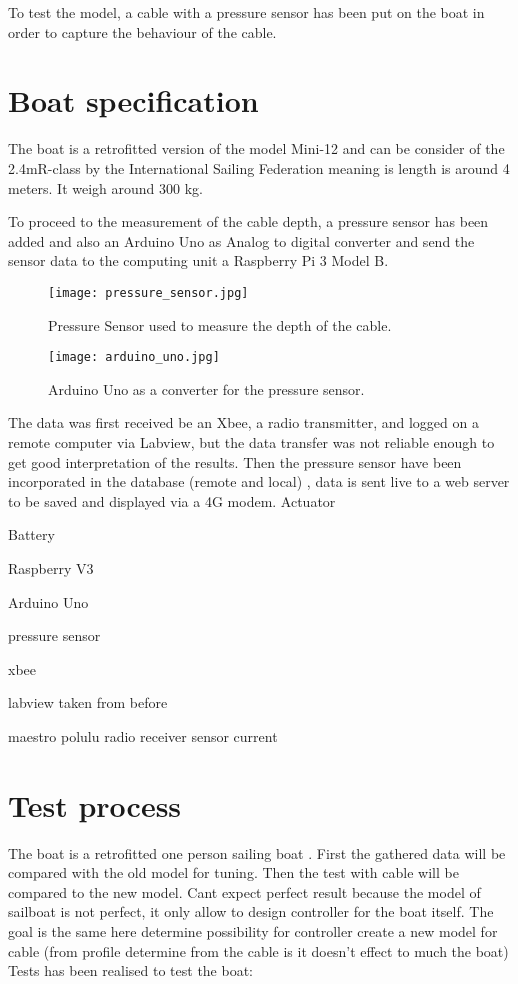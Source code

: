 To test the model, a cable with a pressure sensor has been put on the boat in order to capture the behaviour of the cable.



\section*{Boat specification}

The boat is a retrofitted version of the model Mini-12 and can be consider of the 2.4mR-class by the International Sailing Federation meaning is length is around 4 meters. It weigh around 300 kg.

To proceed to the measurement of the cable depth, a pressure sensor has been added and also an Arduino  Uno as  Analog to digital converter and send the sensor data to the computing unit a Raspberry Pi 3 Model B.

\begin{figure}[H]
\centering
    \begin{minipage}[b]{0.4\textwidth}
    \centering
    \texttt{[image: pressure\_sensor.jpg]}
    \caption{Pressure Sensor used to measure the depth of the cable.}
    \label{fig:pressure sensor}
    \end{minipage}
    \hfill
    \begin{minipage}[b]{0.45\textwidth}
    \centering
    \texttt{[image: arduino\_uno.jpg]}
    \caption{Arduino Uno as a converter for the pressure sensor.}
    \label{fig:comp_depth_speed_2007}
    \end{minipage}
\end{figure}

The data was first received be an Xbee, a radio transmitter, and logged on a remote computer via Labview, but the data transfer was not reliable enough to get good interpretation of the results. Then the pressure sensor have been incorporated in the database (remote and local) , data is sent live to a web server to be saved and displayed via a 4G modem. 
Actuator

Battery

Raspberry V3

Arduino Uno 

pressure sensor

xbee 

labview  taken from before

maestro polulu
 radio receiver
 sensor current
\section{Test process}
The boat is a retrofitted one person sailing boat . 
First the gathered data will be compared with the old model for tuning. Then the test with cable will be compared to the new model.
Cant expect perfect result because the model of sailboat is not perfect, it only allow to design controller for the boat itself. The goal is the same here determine possibility for controller create a new model for cable (from profile determine from the cable is it doesn't effect to much the boat)
Tests has been realised to test the boat:

